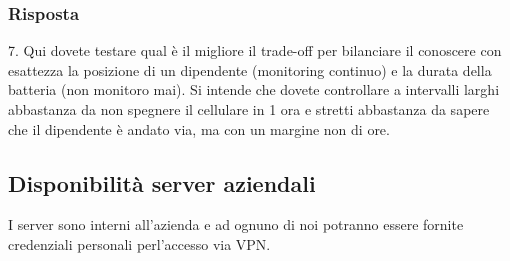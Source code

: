 \subsubsection*{Risposta}
7. Qui dovete testare qual è il migliore il trade-off per bilanciare il conoscere con esattezza la posizione di un dipendente (monitoring continuo) e la durata della batteria (non monitoro mai). Si intende che dovete controllare a intervalli larghi abbastanza da non spegnere il cellulare in 1 ora e stretti abbastanza da sapere che il dipendente è andato via, ma con un margine non di ore.


\subsection*{Disponibilità server aziendali}
I server sono interni all'azienda e ad ognuno di noi potranno essere fornite credenziali personali perl'accesso via VPN.





